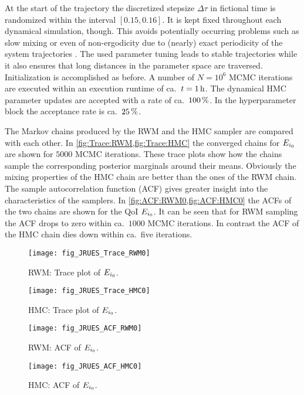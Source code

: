 At the start of the trajectory the discretized stepsize \(\Delta\tau\) in fictional time is randomized within the interval \([0.15,0.16]\).
It is kept fixed throughout each dynamical simulation, though.
This avoids potentially occurring problems such as slow mixing or even of non-ergodicity due to (nearly) exact periodicity of the system trajectories \cite{MCMC:Mackenzie1989}.
The used parameter tuning leads to stable trajectories while it also ensures that long distances in the parameter space are traversed.
Initialization is accomplished as before.
A number of \(N = 10^6\) MCMC iterations are executed within an execution runtime of ca.\ \(t = \unit[1]{h}\).
The dynamical HMC parameter updates are accepted with a rate of ca.\ \(\unit[100]{\%}\).
In the hyperparameter block the acceptance rate is ca.\ \(\unit[25]{\%}\).
\par %
The Markov chains produced by the RWM and the HMC sampler are compared with each other.
In \cref{fig:Trace:RWM,fig:Trace:HMC} the converged chains for \(E_{\analyzed}\) are shown for \(5000\) MCMC iterations.
These trace plots show how the chains sample the corresponding posterior marginals around their means.
Obviously the mixing properties of the HMC chain are better than the ones of the RWM chain.
The sample autocorrelation function (ACF) gives greater insight into the characteristics of the samplers.
In \cref{fig:ACF:RWM0,fig:ACF:HMC0} the ACFs of the two chains are shown for the QoI \(E_{\analyzed}\).
It can be seen that for RWM sampling the ACF drops to zero within ca.\ \(1000\) MCMC iterations.
In contrast the ACF of the HMC chain dies down within ca.\ five iterations.
\begin{figure}[ht]
  \begin{minipage}[b]{0.49\linewidth}
    \centering
    \texttt{[image: fig\_JRUES\_Trace\_RWM0]}
    \caption[RWM: Trace plot of \(E_{\analyzed}\)]{RWM: Trace plot of \(E_{\analyzed}\).}
    \label{fig:Trace:RWM}
  \end{minipage}%
  \hfill
  \begin{minipage}[b]{0.49\linewidth}
    \centering
    \texttt{[image: fig\_JRUES\_Trace\_HMC0]}
    \caption[HMC: Trace plot of \(E_{\analyzed}\)]{HMC: Trace plot of \(E_{\analyzed}\).}
    \label{fig:Trace:HMC}
  \end{minipage}%
\end{figure}
\begin{figure}[ht]
  \begin{minipage}[b]{0.49\linewidth}
    \centering
    \texttt{[image: fig\_JRUES\_ACF\_RWM0]}
    \caption[RWM: ACF of \(E_{\analyzed}\)]{RWM: ACF of \(E_{\analyzed}\).}
    \label{fig:ACF:RWM0}
  \end{minipage}%
  \hfill
  \begin{minipage}[b]{0.49\linewidth}
    \centering
    \texttt{[image: fig\_JRUES\_ACF\_HMC0]}
    \caption[HMC: ACF of \(E_{\analyzed}\)]{HMC: ACF of \(E_{\analyzed}\).}
    \label{fig:ACF:HMC0}
  \end{minipage}%
\end{figure}
